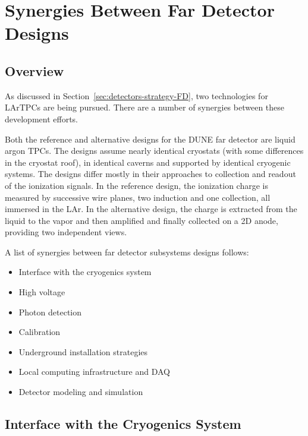 \chapter{Synergies Between Far Detector Designs}
\label{ch:detectors-synergy}

\section{Overview}

As discussed in Section~\ref{sec:detectors-strategy-FD}, two
technologies for LArTPCs are being pursued. There are a number of
synergies between these development efforts.

Both the reference and alternative designs for the DUNE far detector
are liquid argon TPCs. The designs assume nearly identical cryostats
(with some differences in the cryostat roof), in identical caverns and
supported by identical cryogenic systems. The designs differ mostly in
their approaches to collection and readout of the ionization
signals. In the reference design, the ionization charge is measured by
successive wire planes, two induction and one collection, all immersed
in the LAr. In the alternative design, the charge is extracted from
the liquid to the vapor and then amplified and finally collected on a
2D anode, providing two independent views.

A list of synergies between far detector subsystems designs follows:
\begin{itemize}
\item Interface with the cryogenics system
\item High voltage 
\item Photon detection
\item Calibration
\item Underground installation strategies
\item Local computing infrastructure and DAQ
\item Detector modeling and simulation
\end{itemize}

  


\section{Interface with the Cryogenics System}

